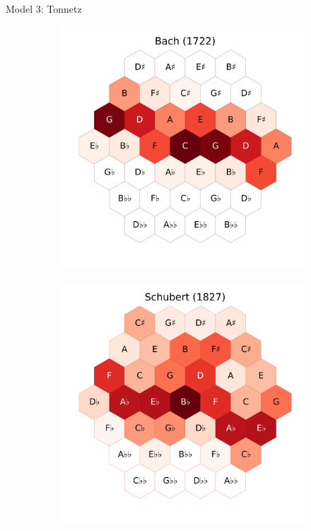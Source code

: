 \documentclass[final,cmyk]{beamer}
\begin{document}
\begin{frame}[t]
\begin{minipage}[t][.69\textheight][t]{\textwidth}
\begin{columns}[t]
\begin{column}{0.3\textwidth}
\begin{block}{Model 3: Tonnetz}
\begin{figure}
\begin{subfigure}{\textwidth}
					\includegraphics[width=\textwidth]{img/bach_tonnetz.png}
				\end{subfigure}
				\begin{subfigure}{\textwidth} %
					\includegraphics[width=\textwidth]{img/schubert_tonnetz.png}
				\end{subfigure}
			\end{figure}


\end{block}
\end{column}
\end{columns}
\end{minipage}
\end{frame}
\end{document}
